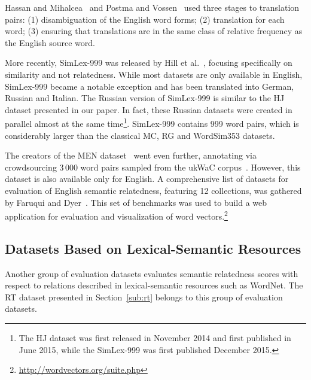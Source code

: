 \documentclass[runningheads,a4paper]{llncs}
\begin{document}
Hassan and Mihalcea~\cite{Hassan:09} and Postma and Vossen~\cite{Postma:14} used three stages to  translation pairs: (1) disambiguation of the English word forms; (2) translation for each word; (3) ensuring that translations are in the same class of relative frequency as the English source word.

More recently, SimLex-999 was released by Hill et al.~\cite{Hill:15}, focusing specifically on similarity and not relatedness. While most datasets are only available in English, SimLex-999 became a notable exception and has been translated into German, Russian and Italian. The Russian version of SimLex-999 is similar to the HJ dataset presented in our paper. In fact, these Russian datasets were created in parallel almost at the same time\footnote{The HJ dataset was first released in November 2014 and first published in June 2015, while the SimLex-999 was first published December 2015.}. SimLex-999 contains 999 word pairs, which is considerably larger than the classical MC, RG and WordSim353 datasets. 

The creators of the MEN dataset~\cite{Bruni:14} went even further, annotating via crowdsourcing 3\,000 word pairs sampled from the ukWaC corpus~\cite{Ferraresi:08}. However, this dataset is also  available only for English. A comprehensive list of datasets for evaluation of English semantic relatedness, featuring 12 collections, was gathered by Faruqui and Dyer~\cite{Faruqui:14}. This set of benchmarks was used to build a web application for evaluation and visualization of word vectors.\footnote{\url{http://wordvectors.org/suite.php}}


\subsection{Datasets Based on Lexical-Semantic Resources}

Another group of evaluation datasets evaluates semantic relatedness scores with respect to relations described in lexical-semantic resources such as WordNet. The RT dataset presented in Section~\ref{sub:rt} belongs to this group of evaluation datasets.
\end{document}
